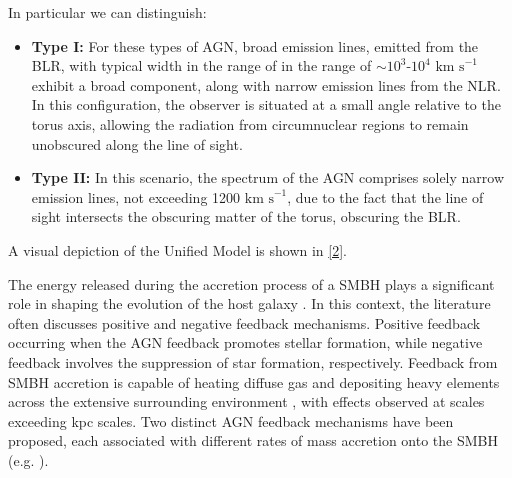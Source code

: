 In particular we can distinguish:
 
\begin{itemize}
  \item \textbf{Type I:} For these types of AGN, broad emission lines, emitted from the BLR, with typical width in the range of in the range of $\sim 10^{3}$-$10^{4}$ $\text{km s}^{-1}$ exhibit a broad component,  along with narrow emission lines from the NLR. In this configuration, the observer is situated at a small angle relative to the torus axis, allowing the radiation from circumnuclear regions to remain unobscured along the line of sight.
  
  \item \textbf{Type II:} In this scenario, the spectrum of the AGN comprises solely narrow emission lines, not exceeding 1200 $  \text{km s}^{-1}$, due to the fact that the line of sight intersects the obscuring matter of the torus, obscuring the BLR.
  
\end{itemize}
A visual depiction of the Unified Model is shown in \autoref{2}.

The energy released during the accretion process of a SMBH plays a significant role in shaping the evolution of the host galaxy \cite{2021A&A...646A.167M}. In this context, the literature often discusses positive and negative feedback mechanisms.
Positive feedback occurring when the AGN feedback promotes stellar formation, while negative feedback involves the suppression of star formation, respectively. Feedback from SMBH accretion is capable of heating diffuse gas \cite{2005Natur.433..604D} and depositing heavy elements across the extensive surrounding environment \cite{2000ApJ...539L..13G}, with effects observed at scales exceeding kpc scales. Two distinct AGN feedback mechanisms have been proposed, each associated with different rates of mass accretion onto the SMBH (e.g. \cite{2012ARA&A..50..455F, 2017NatAs...1E.165H}).


